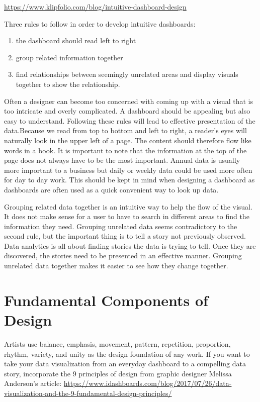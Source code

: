 \documentclass[]{book}
\providecommand{\tightlist}{%
  \setlength{\itemsep}{0pt}\setlength{\parskip}{0pt}}
\theoremstyle{definition}
\theoremstyle{definition}
\theoremstyle{definition}
\theoremstyle{remark}
\begin{document}
\url{https://www.klipfolio.com/blog/intuitive-dashboard-design}

Three rules to follow in order to develop intuitive dashboards:

\begin{enumerate}
\def\labelenumi{\arabic{enumi}.}
\tightlist
\item
  the dashboard should read left to right
\item
  group related information together
\item
  find relationships between seemingly unrelated areas and display
  visuals together to show the relationship.
\end{enumerate}

Often a designer can become too concerned with coming up with a visual
that is too intricate and overly complicated. A dashboard should be
appealing but also easy to understand. Following these rules will lead
to effective presentation of the data.Because we read from top to bottom
and left to right, a reader's eyes will naturally look in the upper left
of a page. The content should therefore flow like words in a book. It is
important to note that the information at the top of the page does not
always have to be the most important. Annual data is usually more
important to a business but daily or weekly data could be used more
often for day to day work. This should be kept in mind when designing a
dashboard as dashboards are often used as a quick convenient way to look
up data.

Grouping related data together is an intuitive way to help the flow of
the visual. It does not make sense for a user to have to search in
different areas to find the information they need. Grouping unrelated
data seems contradictory to the second rule, but the important thing is
to tell a story not previously observed. Data analytics is all about
finding stories the data is trying to tell. Once they are discovered,
the stories need to be presented in an effective manner. Grouping
unrelated data together makes it easier to see how they change together.

\section{Fundamental Components of
Design}\label{fundamental-components-of-design}

Artists use balance, emphasis, movement, pattern, repetition,
proportion, rhythm, variety, and unity as the design foundation of any
work. If you want to take your data visualization from an everyday
dashboard to a compelling data story, incorporate the 9 principles of
design from graphic designer Melissa Anderson's article:
\url{https://www.idashboards.com/blog/2017/07/26/data-visualization-and-the-9-fundamental-design-principles/}
\end{document}
